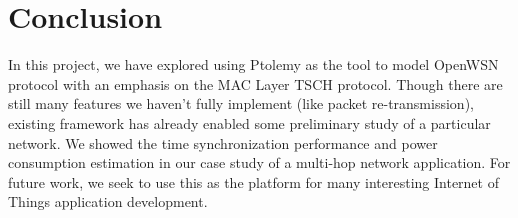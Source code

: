 
\section{Conclusion}
\label{sec:conclusion}

In this project, we have explored using Ptolemy as the tool to model OpenWSN protocol with an emphasis on the MAC Layer TSCH protocol. Though there are still many features we haven't fully implement (like packet re-transmission), existing framework has already enabled some preliminary study of a particular network. We showed the time synchronization performance and power consumption estimation in our case study of a multi-hop network application. For future work, we seek to use this as the platform for many interesting Internet of Things application development. 

